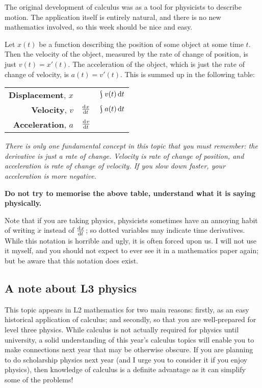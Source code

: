 



The original development of calculus was as a tool for physicists to describe motion. The application itself is entirely natural,
and there is no new mathematics involved, so this week should be nice and easy.

Let $ x(t) $ be a function describing the position of some object at some time $ t $. Then the velocity of the object,
measured by the rate of change of position, is just $ v(t) = x'(t) $. The acceleration of the object, which is just the
rate of change of velocity, is $ a(t) = v'(t) $. This is summed up in the following table:
\begin{center}
  \def\arraystretch{1.5}
  \begin{tabular}{|rcc|}\hline
    \textbf{Displacement}, $ x $ && $\rint v(t) \dif{t} $\\
    \textbf{Velocity}, $ v $ & $ \od{x}{t} $ & $ \rint a(t) \dif{t} $\\
    \textbf{Acceleration}, $ a $ & $ \od{v}{t} $ &\\\hline
  \end{tabular}
\end{center}

\begin{center}\itshape
  There is only one fundamental concept in this topic that you must remember: the derivative is just a rate of
  change. Velocity is rate of change of position, and acceleration is rate of change of velocity. If you slow down faster,
  your acceleration is more negative.

  \textbf{Do not try to memorise the above table, understand what it is saying physically.}
\end{center}

Note that if you are taking physics, physicists sometimes have an annoying habit of writing $ \dot x $ instead of $ \od{x}{t} $; so
dotted variables may indicate time derivatives. While this notation is horrible and ugly, it is often forced upon us. I will not use
it myself, and you should not expect to ever see it in a mathematics paper again; but be aware that this notation does exist.

\subsection*{A note about L3 physics}
This topic appears in L2 mathematics for two main reasons: firstly, as an easy historical application of calculus; and secondly, so
that you are well-prepared for level three physics. While calculus is not actually required for physics until university, a solid
understanding of this year's calculus topics will enable you to make connections next year that may be otherwise obscure. If you are
planning to do scholarship physics next year (and I urge you to consider it if you enjoy physics), then knowledge of calculus is a
definite advantage as it can simplify some of the problems!

